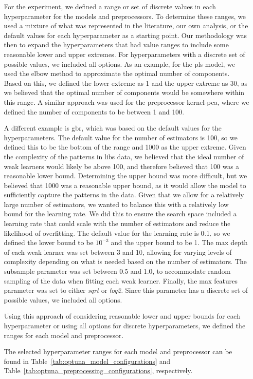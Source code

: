 For the experiment, we defined a range or set of discrete values in each hyperparameter for the models and preprocessors. 
To determine these ranges, we used a mixture of what was represented in the literature, our own analysis, or the default values for each hyperparameter as a starting point. 
Our methodology was then to expand the hyperparameters that had value ranges to include some reasonable lower and upper extremes. 
For hyperparameters with a discrete set of possible values, we included all options. 
As an example, for the \gls{pls} model, we used the elbow method to approximate the optimal number of components. 
Based on this, we defined the lower extreme as 1 and the upper extreme as 30, as we believed that the optimal number of components would be somewhere within this range. 
A similar approach was used for the preprocessor \gls{kernel-pca}, where we defined the number of components to be between 1 and 100.

A different example is \gls{gbr}, which was based on the default values for the hyperparameters.
The default value for the number of estimators is 100, so we defined this to be the bottom of the range and 1000 as the upper extreme. 
Given the complexity of the patterns in \gls{libs} data, we believed that the ideal number of weak learners would likely be above 100, and therefore believed that 100 was a reasonable lower bound. 
Determining the upper bound was more difficult, but we believed that 1000 was a reasonable upper bound, as it would allow the model to sufficiently capture the patterns in the data. 
Given that we allow for a relatively large number of estimators, we wanted to balance this with a relatively low bound for the learning rate. 
We did this to ensure the search space included a learning rate that could scale with the number of estimators and reduce the likelihood of overfitting. 
The default value for the learning rate is 0.1, so we defined the lower bound to be $10^{-3}$ and the upper bound to be 1. 
The max depth of each weak learner was set between 3 and 10, allowing for varying levels of complexity depending on what is needed based on the number of estimators. 
The subsample parameter was set between 0.5 and 1.0, to accommodate random sampling of the data when fitting each weak learner. 
Finally, the max features parameter was set to either \textit{sqrt} or \textit{log2}. Since this parameter has a discrete set of possible values, we included all options.

Using this approach of considering reasonable lower and upper bounds for each hyperparameter or using all options for discrete hyperparameters, we defined the ranges for each model and preprocessor.

The selected hyperparameter ranges for each model and preprocessor can be found in Table~\ref{tab:optuna_model_configurations} and Table~\ref{tab:optuna_preprocessing_configurations}, respectively.
